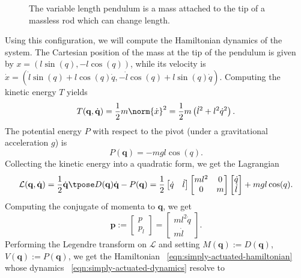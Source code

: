 \begin{figure}
   \centering
   
   \caption{The variable length pendulum is a mass attached to the
      tip of a massless rod which can change length.}\label{fig:vlp-model}
\end{figure}

Using this configuration, we will compute the Hamiltonian dynamics of the system.
The Cartesian position of the mass at the tip of the pendulum
is given by \(x = (l\sin(q),-l\cos(q))\), while its velocity is
\(\dot{x} = (\dot{l}\sin(q) + l\cos(q)\dot{q}, -\dot{l}\cos(q) + l\sin(q)\dot{q})\).
Computing the kinetic energy \(T\) yields
\[
   T(\mathbf{q},\dot{\mathbf{q}}) = 
   \frac{1}{2}m\norm{\dot{x}}^2 = \frac{1}{2}m\left(\dot{l}^2 + l^2\dot{q}^2\right)
   .
\]
The potential energy \(P\) with respect to the pivot (under a gravitational
acceleration \(g\)) is
\[
   P(\mathbf{q}) = -mgl\cos(q)
   .
\]
Collecting the kinetic energy into a quadratic form, we get the Lagrangian
\[
   \mathcal{L}(\mathbf{q},\dot{\mathbf{q}}) 
   = \frac{1}{2} \dot{\mathbf{q}}\tpose D(\mathbf{q})\dot{\mathbf{q}} - P(\mathbf{q})
   = \frac{1}{2}
   \begin{bmatrix} \dot{q} & \dot{l} \end{bmatrix}
   \begin{bmatrix}
      ml^2 & 0 \\
      0 & m \\
   \end{bmatrix}
   \begin{bmatrix} 
      \dot{q} \\ \dot{l}
   \end{bmatrix}
   + mgl\cos(q)
   .
\]
Computing the conjugate of momenta to \(\mathbf{q}\), we get 
\[
   \mathbf{p} := \begin{bmatrix} p \\ p_l \end{bmatrix} 
   = \begin{bmatrix} ml^2\dot{q} \\ m\dot{l} \end{bmatrix} 
   .
\]
Performing the Legendre transform on \(\mathcal{L}\) and setting
\(M(\mathbf{q}) := D(\mathbf{q})\), \(V(\mathbf{q}) := P(\mathbf{q})\),
we get the Hamiltonian ~\eqref{eqn:simply-actuated-hamiltonian} whose
dynamics ~\eqref{eqn:simply-actuated-dynamics} resolve to  
